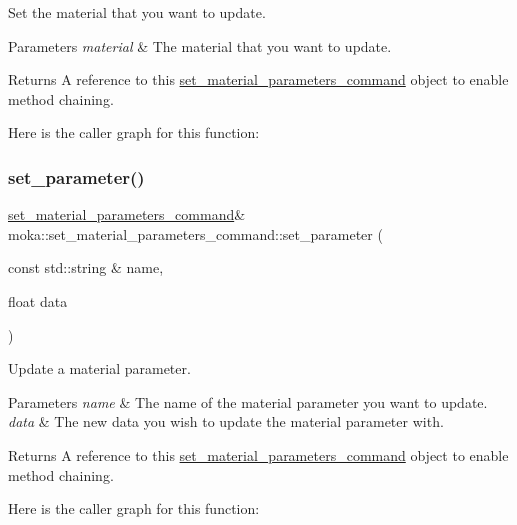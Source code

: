Set the material that you want to update. 


\begin{DoxyParams}{Parameters}
{\em material} & The material that you want to update. \\
\hline
\end{DoxyParams}
\begin{DoxyReturn}{Returns}
A reference to this \mbox{\hyperlink{classmoka_1_1set__material__parameters__command}{set\+\_\+material\+\_\+parameters\+\_\+command}} object to enable method chaining. 
\end{DoxyReturn}
Here is the caller graph for this function\+:
\mbox{\label{classmoka_1_1set__material__parameters__command_ad91e42c050a7acdef5190f820aee5dc0}} 
\subsubsection{\texorpdfstring{set\_parameter()}{set\_parameter()}\hspace{0.1cm}{\footnotesize\ttfamily [1/6]}}
{\footnotesize\ttfamily \mbox{\hyperlink{classmoka_1_1set__material__parameters__command}{set\+\_\+material\+\_\+parameters\+\_\+command}}\& moka\+::set\+\_\+material\+\_\+parameters\+\_\+command\+::set\+\_\+parameter (\begin{DoxyParamCaption}\item[{const std\+::string \&}]{name,  }\item[{float}]{data }\end{DoxyParamCaption})}



Update a material parameter. 


\begin{DoxyParams}{Parameters}
{\em name} & The name of the material parameter you want to update. \\
\hline
{\em data} & The new data you wish to update the material parameter with. \\
\hline
\end{DoxyParams}
\begin{DoxyReturn}{Returns}
A reference to this \mbox{\hyperlink{classmoka_1_1set__material__parameters__command}{set\+\_\+material\+\_\+parameters\+\_\+command}} object to enable method chaining. 
\end{DoxyReturn}
Here is the caller graph for this function\+:
\mbox{\label{classmoka_1_1set__material__parameters__command_a8cc11d17514f90ab4a350bc1a270afbd}} 
